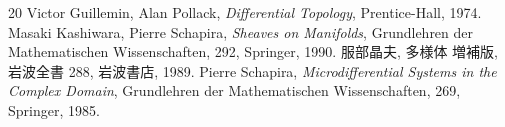 \begin{thebibliography}{20} 
   Victor Guillemin, Alan Pollack, 
    \textit{Differential Topology}, 
    Prentice-Hall, 1974.
   Masaki Kashiwara, Pierre Schapira, 
    \textit{Sheaves on Manifolds}, 
    Grundlehren der Mathematischen Wissenschaften, 292, Springer, 1990.
   服部晶夫, 多様体 増補版, 岩波全書 288, 岩波書店, 1989.
   Pierre Schapira, 
    \textit{Microdifferential Systems in the Complex Domain}, 
    Grundlehren der Mathematischen Wissenschaften, 269, 
    Springer, 1985.
\end{thebibliography}






